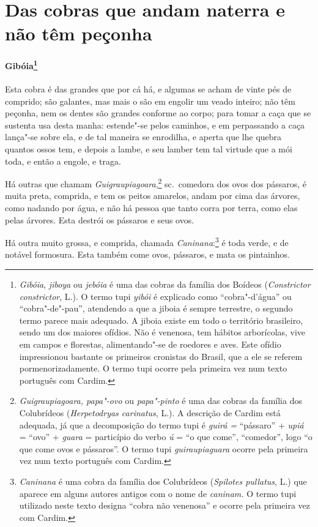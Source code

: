 \section[Das cobras que andam na terra e não têm peçonha]{Das cobras que andam na\break terra e não têm peçonha}
\paragraph{Gibóia\footnote{ \textit{Gibóia}, \textit{jiboya} ou 
\textit{jebóia} é uma das cobras da família dos Boídeos 
(\textit{Constrictor constrictor}, L.). O termo tupi \textit{yibói} é
explicado como ``cobra"-d'água'' ou ``cobra"-de"-pau'', atendendo a que a
jiboia é sempre terrestre, o segundo termo parece mais adequado. A
jiboia existe em todo o território brasileiro, sendo um dos maiores
ofídios. Não é venenosa, tem hábitos arborícolas, vive em campos e
florestas, alimentando"-se de roedores e aves. Este ofídio impressionou
bastante os primeiros cronistas do Brasil, que a ele se referem
pormenorizadamente. O termo tupi ocorre pela primeira vez num texto
português com Cardim.}} Esta cobra é das grandes que por cá há,
e algumas se acham de vinte pés de comprido; são galantes, mas mais o
são em engolir um veado inteiro; não têm peçonha, nem os dentes são
grandes conforme ao corpo; para tomar a caça que se sustenta usa desta
manha: estende"-se pelos caminhos, e em perpassando a caça lança"-se
sobre ela, e de tal maneira se enrodilha, e aperta que lhe quebra
quantos ossos tem, e depois a lambe, e seu lamber tem tal virtude que a
mói toda, e então a engole, e traga. 

 Há outras que chamam \textit{Guigraupiagoara},\footnote{ \textit{Guigraupiagoara, 
papa"-ovo} ou \textit{papa"-pinto} é uma das
cobras da família dos Colubrídeos (\textit{Herpetodryas carinatus}, L.). 
A descrição de Cardim está adequada, já que a decomposição do
termo tupi é \textit{guirá =} ``pássaro'' + \textit{upiá} = ``ovo'' +
\textit{guara} = particípio do verbo \textit{ú} = ``o que come'',
``comedor'', logo ``o que come ovos e pássaros''. O termo tupi
\textit{guiraupiaguara} ocorre pela primeira vez num texto português
com Cardim.} sc.~comedora dos ovos dos pássaros, é muita preta,
comprida, e tem os peitos amarelos, andam por cima das árvores, como
nadando por água, e não há pessoa que tanto corra por terra, como elas
pelas árvores. Esta destrói os pássaros e seus ovos.

 Há outra muito grossa, e comprida, chamada \textit{Caninana}:\footnote{ \textit{Caninana} 
é uma cobra da família dos Colubrídeos (\textit{Spilotes pullatus}, L.) 
que aparece em alguns autores antigos com o nome de \textit{caninam.} O termo tupi utilizado neste texto
designa ``cobra não venenosa'' e ocorre pela primeira vez com Cardim.} é
toda verde, e de notável formosura. Esta também come ovos, pássaros, e mata os pintainhos.

